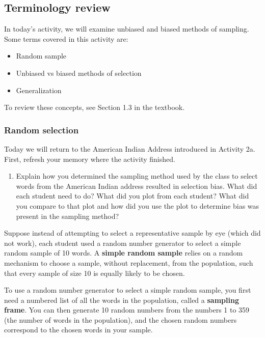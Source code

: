 \documentclass[
]{report}
\providecommand{\tightlist}{%
  \setlength{\itemsep}{0pt}\setlength{\parskip}{0pt}}
\begin{document}
\hypertarget{terminology-review-2}{%
\subsection{Terminology review}\label{terminology-review-2}}

In today's activity, we will examine unbiased and biased methods of sampling. Some terms covered in this activity are:

\begin{itemize}
\item
  Random sample
\item
  Unbiased vs biased methods of selection
\item
  Generalization
\end{itemize}

To review these concepts, see Section 1.3 in the textbook.

\hypertarget{random-selection}{%
\subsubsection*{Random selection}\label{random-selection}}

Today we will return to the American Indian Address introduced in Activity 2a. First, refresh your memory where the activity finished.

\begin{enumerate}
\def\labelenumi{\arabic{enumi}.}
\tightlist
\item
  Explain how you determined the sampling method used by the class to select words from the American Indian address resulted in selection bias. What did each student need to do? What did you plot from each student? What did you compare to that plot and how did you use the plot to determine bias was present in the sampling method?
  \vspace{1.5in}
\end{enumerate}

Suppose instead of attempting to select a representative sample by eye (which did not work), each student used a random number generator to select a simple random sample of 10 words. A \textbf{simple random sample} relies on a random mechanism to choose a sample, without replacement, from the population, such that every sample of size 10 is equally likely to be chosen.

To use a random number generator to select a simple random sample, you first need a numbered list of all the words in the population, called a \textbf{sampling frame}. You can then generate 10 random numbers from the numbers 1 to 359 (the number of words in the population), and the chosen random numbers correspond to the chosen words in your sample.
\end{document}
